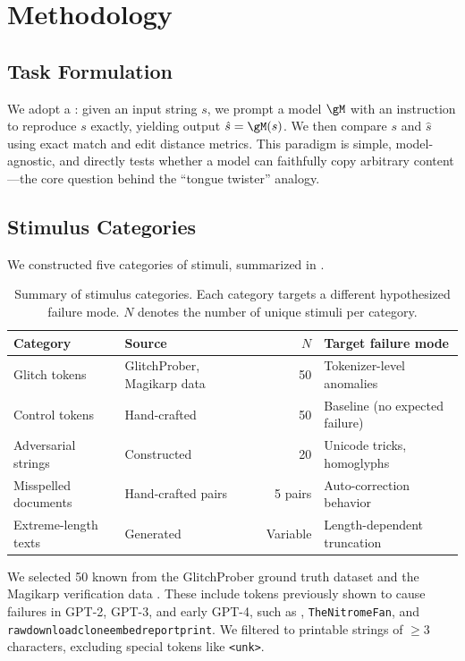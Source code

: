 \section{Methodology}
\label{sec:method}

\subsection{Task Formulation}

We adopt a : given an input string $s$, we prompt a model $\gM$ with an instruction to reproduce $s$ exactly, yielding output $\hat{s} = \gM(s)$. We then compare $s$ and $\hat{s}$ using exact match and edit distance metrics. This paradigm is simple, model-agnostic, and directly tests whether a model can faithfully copy arbitrary content---the core question behind the ``tongue twister'' analogy.

\subsection{Stimulus Categories}

We constructed five categories of stimuli, summarized in .

\begin{table}[t]
    \centering
    \caption{Summary of stimulus categories. Each category targets a different hypothesized failure mode. $N$ denotes the number of unique stimuli per category.}
    \label{tab:stimuli}
    \begin{tabular}{@{}llrl@{}}
        \toprule
        \textbf{Category} & \textbf{Source} & \textbf{$N$} & \textbf{Target failure mode} \\
        \midrule
        Glitch tokens & GlitchProber, Magikarp data & 50 & Tokenizer-level anomalies \\
        Control tokens & Hand-crafted & 50 & Baseline (no expected failure) \\
        Adversarial strings & Constructed & 20 & Unicode tricks, homoglyphs \\
        Misspelled documents & Hand-crafted pairs & 5 pairs & Auto-correction behavior \\
        Extreme-length texts & Generated & Variable & Length-dependent truncation \\
        \bottomrule
    \end{tabular}
\end{table}

We selected 50 known \glitchtokens from the GlitchProber ground truth dataset \citep{zhang2024glitchprober} and the Magikarp verification data \citep{land2024fishing}. These include tokens previously shown to cause failures in GPT-2, GPT-3, and early GPT-4, such as \magikarp, \texttt{TheNitromeFan}, and \texttt{rawdownloadcloneembedreportprint}. We filtered to printable strings of $\geq$3 characters, excluding special tokens like \texttt{<unk>}.

